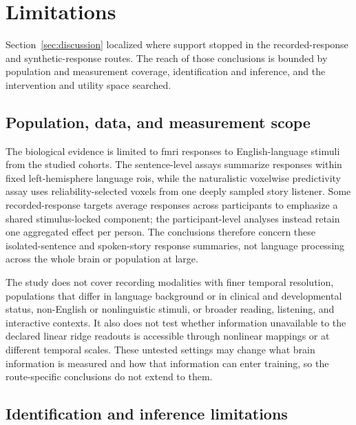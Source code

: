 \section{Limitations}
\label{sec:limitations}

Section~\ref{sec:discussion} localized where support stopped in the recorded-response and synthetic-response routes.
The reach of those conclusions is bounded by population and measurement coverage, identification and inference, and the intervention and utility space searched.

\subsection{Population, data, and measurement scope}

The biological evidence is limited to \ac{fmri} responses to English-language stimuli from the studied cohorts.
The sentence-level assays summarize responses within fixed left-hemisphere language \acp{roi}, while the naturalistic voxelwise predictivity assay uses reliability-selected voxels from one deeply sampled story listener.
Some recorded-response targets average responses across participants to emphasize a shared stimulus-locked component; the participant-level analyses instead retain one aggregated effect per person.
The conclusions therefore concern these isolated-sentence and spoken-story response summaries, not language processing across the whole brain or population at large.

The study does not cover recording modalities with finer temporal resolution, populations that differ in language background or in clinical and developmental status, non-English or nonlinguistic stimuli, or broader reading, listening, and interactive contexts.
It also does not test whether information unavailable to the declared linear ridge readouts is accessible through nonlinear mappings or at different temporal scales.
These untested settings may change what brain information is measured and how that information can enter training, so the route-specific conclusions do not extend to them.

\subsection{Identification and inference limitations}

